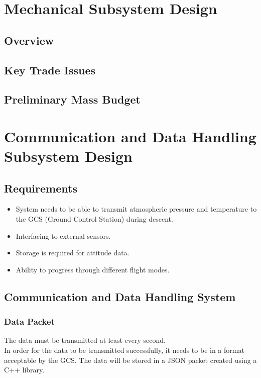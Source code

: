 \documentclass[10pt, a4paper]{article}
\begin{document}
\newpage

\section{Mechanical Subsystem Design}
\subsection{Overview}
\subsection{Key Trade Issues}
\subsection{Preliminary Mass Budget}

\newpage

\section{Communication and Data Handling Subsystem Design}
\subsection{Requirements}
\begin{itemize}
    \item System needs to be able to transmit atmospheric pressure and temperature to the GCS (Ground Control Station) during descent.
    \item Interfacing to external sensors.
    \item Storage is required for attitude data.
    \item Ability to progress through different flight modes.
\end{itemize}
\subsection{Communication and Data Handling System}
\subsubsection{Data Packet}

The data must be transmitted at least every second.\\

In order for the data to be transmitted successfully, it needs to be in a format acceptable by the GCS. The data will be stored in a JSON packet created using a C++ library\cite{ajson}.
\end{document}

